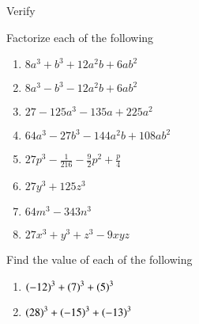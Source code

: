 Verify
\begin{enumerate}[label=\thesubsection.\arabic*.,ref=\thesubsection.\theenumi,resume*]
	\item $x^3+y^3 = \brak{x+y}\brak{x^2-xy+y^2}$
	\item $x^3-y^3 = \brak{x-y}\brak{x^2+xy+y^2}$
	\item $x^3+y^3+z^3-3xyz = \frac{1}{2}\brak{x+y+z}\sbrak{\brak{x-y}^{2}+\brak{y-z}^{2}+\brak{z-x}^{2}$
\end{enumerate}
Factorize each of the following
\begin{enumerate}[label=\thesubsection.\arabic*.,ref=\thesubsection.\theenumi]
	\item $8a^3+b^3+12a^2b+6ab^2$
	\item $8a^3-b^3-12a^2b+6ab^2$
	\item $27-125a^3-135a+225a^2$
	\item $64a^3-27b^3-144a^2b+108ab^2$
	\item $27p^3-\frac{1}{216}-\frac{9}{2}p^2 + \frac{p}{4}$
	\item $27y^3+125z^3$ 
	\item $64m^3-343n^3$
	\item $27x^3+y^3+z^3-9xyz$
\end{enumerate}
Find the value of each of the following 
\begin{enumerate}[label=\thesubsection.\arabic*.,ref=\thesubsection.\theenumi,resume*]
	\item $\brak{-12}^3+\brak{7}^3+\brak{5}^3$
	\item $\brak{28}^3+\brak{-15}^3+\brak{-13}^3$
\end{enumerate}
